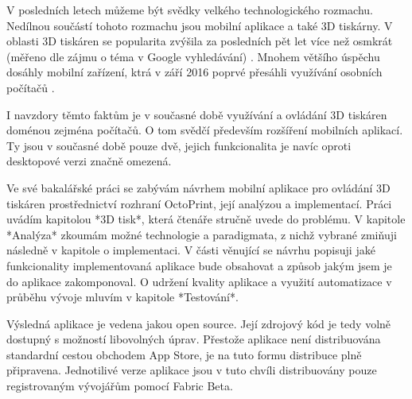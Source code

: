 V posledních letech můžeme být svědky velkého technologického rozmachu.
Nedílnou součástí tohoto rozmachu jsou mobilní aplikace a také 3D tiskárny.
V oblasti 3D tiskáren se popularita zvýšila za posledních pět let více než osmkrát (měřeno dle zájmu o téma v Google vyhledávání) \cite{3d-print-google-trends}.
Mnohem většího úspěchu dosáhly mobilní zařízení, ktrá v září 2016 poprvé přesáhli využívání osobních počítačů \cite{mobile-devices-market-share}.

I navzdory těmto faktům je v současné době využívání a ovládání 3D tiskáren doménou zejména počítačů.
O tom svědčí především rozšíření mobilních aplikací.
Ty jsou v současné době pouze dvě, jejich funkcionalita je navíc oproti desktopové verzi značně omezená.

Ve své bakalářské práci se zabývám návrhem mobilní aplikace pro ovládání 3D tiskáren prostřednictví rozhraní OctoPrint, její analýzou a implementací.
Práci uvádím kapitolou *3D tisk*, která čtenáře stručně uvede do problému.
V kapitole *Analýza* zkoumám možné technologie a paradigmata, z nichž vybrané zmiňuji následně v kapitole o implementaci.
V části věnující se návrhu popisuji jaké funkcionality implementovaná aplikace bude obsahovat a způsob jakým jsem je do aplikace zakomponoval.
O udržení kvality aplikace a využití automatizace v průběhu vývoje mluvím v kapitole *Testování*.

Výsledná aplikace je vedena jakou open source.
Její zdrojový kód je tedy volně dostupný s možností libovolných úprav.
Přestože aplikace není distribuována standardní cestou obchodem App Store, je na tuto formu distribuce plně připravena.
Jednotilivé verze aplikace jsou v tuto chvíli distribuovány pouze registrovaným vývojářům pomocí Fabric Beta.
